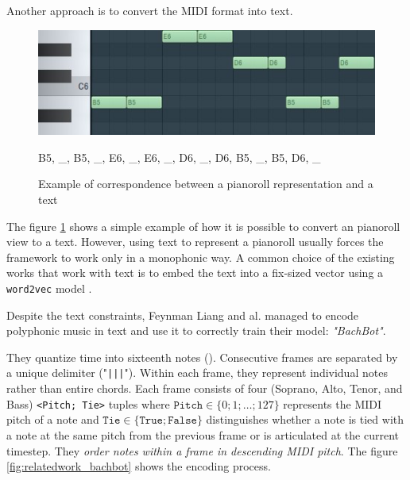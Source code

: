 \documentclass[12pt]{report}
\begin{document}
Another approach is to convert the MIDI format into text. \cite{hadjeres_deepbach:_2016}

\begin{figure}[H]
   \begin{minipage}{0.5\textwidth}
     \centering
     \includegraphics[width=.9\linewidth]{images/music/pianoroll/pianoroll_small_2.jpg}
   \end{minipage}\hfill
   \begin{minipage}{0.5\textwidth}
     \centering
     B5, \_, B5, \_, E6, \_, E6, \_, D6, \_, D6, B5, \_, B5, D6, \_ 
   \end{minipage}
 \caption{Example of correspondence between a pianoroll representation and a text}
 \label{fig:pianoroll_to_text}
\end{figure}

The figure \ref{fig:pianoroll_to_text} shows a simple example of how it is possible to convert an pianoroll view to a text.
However, using text to represent a pianoroll usually forces the framework to work only in a monophonic way.
A common choice of the existing works that work with text is to embed the text into a fix-sized vector using a \texttt{word2vec} \cite{goldberg_word2vec_2014, karani_introduction_2018, rong_word2vec_2016, noauthor_beginners_nodate, mikolov_distributed_2013} model \cite{liang_automatic_2017, herremans_modeling_2017}.

\bigskip

Despite the text constraints, Feynman Liang and al. \cite{liang_automatic_2017} managed to encode polyphonic music in text and use it to correctly train their model: \textit{"BachBot"}.

They quantize time into sixteenth notes (\musEighth). Consecutive frames are separated by a unique delimiter ("\texttt{|||}").
Within each frame, they represent individual notes rather than entire chords.
Each frame consists of four (Soprano, Alto, Tenor, and Bass) \texttt{<Pitch; Tie>} tuples where $\texttt{Pitch} \in \{0; 1; \dots ; 127\}$ represents the MIDI pitch of a note and $\texttt{Tie} \in \{\texttt{True}; \texttt{False}\}$ distinguishes whether a note is tied with a note at the same pitch from the
previous frame or is articulated at the current timestep.
They \textit{order notes within a frame in descending MIDI pitch}.
The figure \ref{fig:relatedwork_bachbot} shows the encoding process.
\end{document}
